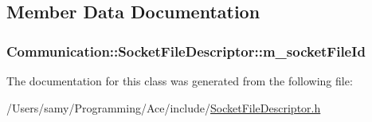 \subsection{Member Data Documentation}
\hypertarget{class_communication_1_1_socket_file_descriptor_acea16d16c15f77de622888f8e45ff87b}{}
\subsubsection[{m\+\_\+socket\+File\+Id}]{ Communication\+::\+Socket\+File\+Descriptor\+::m\+\_\+socket\+File\+Id\hspace{0.3cm}{\ttfamily [private]}}\label{class_communication_1_1_socket_file_descriptor_acea16d16c15f77de622888f8e45ff87b}


The documentation for this class was generated from the following file\+:\begin{DoxyCompactItemize}
\item 
/\+Users/samy/\+Programming/\+Ace/include/\hyperlink{_socket_file_descriptor_8h}{Socket\+File\+Descriptor.\+h}\end{DoxyCompactItemize}
